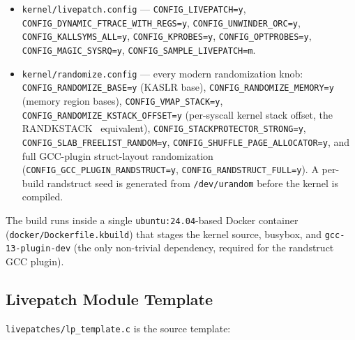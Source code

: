 \documentclass[10pt,letterpaper]{article}
\begin{document}
\begin{itemize}[leftmargin=*]
\item \texttt{kernel/livepatch.config} ---
\texttt{CONFIG\_LIVEPATCH=y}, \texttt{CONFIG\_DYNAMIC\_FTRACE\_WITH\_REGS=y},
\texttt{CONFIG\_UNWINDER\_ORC=y}, \texttt{CONFIG\_KALLSYMS\_ALL=y},
\texttt{CONFIG\_KPROBES=y}, \texttt{CONFIG\_OPTPROBES=y},
\texttt{CONFIG\_MAGIC\_SYSRQ=y}, \texttt{CONFIG\_SAMPLE\_LIVEPATCH=m}.
\item \texttt{kernel/randomize.config} --- every modern randomization
knob: \texttt{CONFIG\_RANDOMIZE\_BASE=y} (KASLR base),
\texttt{CONFIG\_RANDOMIZE\_MEMORY=y} (memory region bases),
\texttt{CONFIG\_VMAP\_STACK=y}, \texttt{CONFIG\_RANDOMIZE\_KSTACK\_OFFSET=y}
(per-syscall kernel stack offset, the
RANDKSTACK~\cite{pax_randkstack} equivalent),
\texttt{CONFIG\_STACKPROTECTOR\_STRONG=y},
\texttt{CONFIG\_SLAB\_FREELIST\_RANDOM=y},
\texttt{CONFIG\_SHUFFLE\_PAGE\_ALLOCATOR=y}, and full GCC-plugin
struct-layout randomization (\texttt{CONFIG\_GCC\_PLUGIN\_RANDSTRUCT=y},
\texttt{CONFIG\_RANDSTRUCT\_FULL=y}). A per-build randstruct seed is
generated from \texttt{/dev/urandom} before the kernel is compiled.
\end{itemize}

The build runs inside a single \texttt{ubuntu:24.04}-based Docker
container (\texttt{docker/Dockerfile.kbuild}) that stages the
kernel source, busybox, and \texttt{gcc-13-plugin-dev} (the only
non-trivial dependency, required for the randstruct GCC plugin).

\subsection{Livepatch Module Template}

\texttt{livepatches/lp\_template.c} is the source template:
\end{document}
